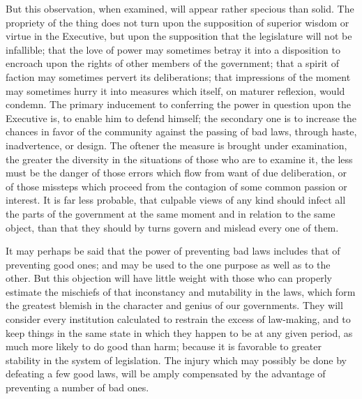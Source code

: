 But this observation, when examined, will appear rather specious than solid. 
The propriety of the thing does not turn upon the supposition of superior wisdom or virtue in the Executive, but upon the supposition that the legislature will not be infallible; that the love of power may sometimes betray it into a disposition to encroach upon the rights of other members of the government; that a spirit of faction may sometimes pervert its deliberations; that impressions of the moment may sometimes hurry it into measures which itself, on maturer reflexion, would condemn. 
The primary inducement to conferring the power in question upon the Executive is, to enable him to defend himself; the secondary one is to increase the chances in favor of the community against the passing of bad laws, through haste, inadvertence, or design. 
The oftener the measure is brought under examination, the greater the diversity in the situations of those who are to examine it, the less must be the danger of those errors which flow from want of due deliberation, or of those missteps which proceed from the contagion of some common passion or interest. 
It is far less probable, that culpable views of any kind should infect all the parts of the government at the same moment and in relation to the same object, than that they should by turns govern and mislead every one of them.

It may perhaps be said that the power of preventing bad laws includes that of preventing good ones; and may be used to the one purpose as well as to the other. 
But this objection will have little weight with those who can properly estimate the mischiefs of that inconstancy and mutability in the laws, which form the greatest blemish in the character and genius of our governments. 
They will consider every institution calculated to restrain the excess of law-making, and to keep things in the same state in which they happen to be at any given period, as much more likely to do good than harm; because it is favorable to greater stability in the system of legislation. 
The injury which may possibly be done by defeating a few good laws, will be amply compensated by the advantage of preventing a number of bad ones.

